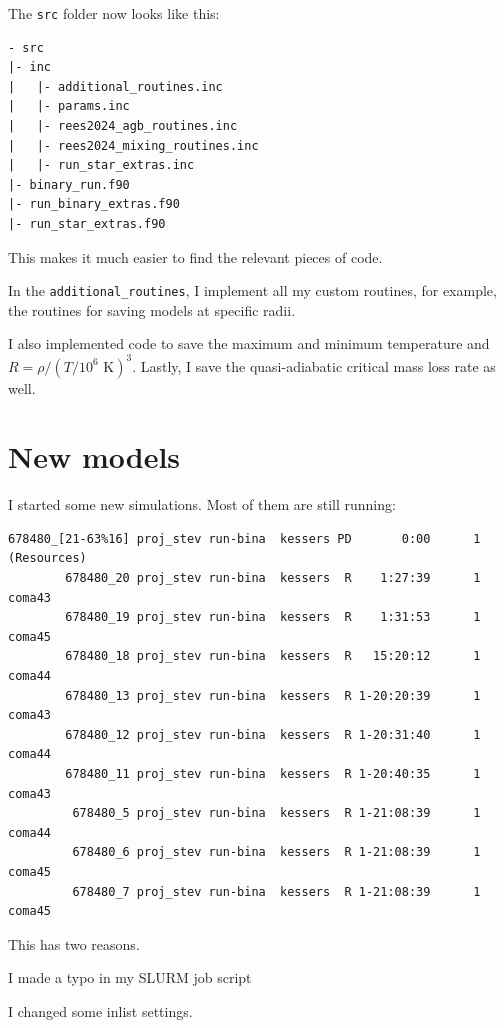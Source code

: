 \documentclass[a4paper,10pt]{article}
\begin{document}
The \lstinline[style=output, breaklines=true]|src| folder now looks like this:
\begin{verbatim}
- src
|- inc
|   |- additional_routines.inc
|   |- params.inc
|   |- rees2024_agb_routines.inc
|   |- rees2024_mixing_routines.inc
|   |- run_star_extras.inc
|- binary_run.f90
|- run_binary_extras.f90
|- run_star_extras.f90
\end{verbatim}

This makes it much easier to find the relevant pieces of code.

In the \lstinline[style=output, breaklines=true]|additional_routines|, I implement all my custom routines, for example, the routines for saving models at specific radii.


I also implemented code to save the maximum and minimum temperature and \(R = \rho / (T / 10^6 \text{ K})^3\). Lastly, I save the quasi-adiabatic critical mass loss rate as well.

\section{New models}

I started some new simulations. Most of them are still running:

\begin{verbatim}
678480_[21-63%16] proj_stev run-bina  kessers PD       0:00      1 (Resources)
        678480_20 proj_stev run-bina  kessers  R    1:27:39      1 coma43
        678480_19 proj_stev run-bina  kessers  R    1:31:53      1 coma45
        678480_18 proj_stev run-bina  kessers  R   15:20:12      1 coma44
        678480_13 proj_stev run-bina  kessers  R 1-20:20:39      1 coma43
        678480_12 proj_stev run-bina  kessers  R 1-20:31:40      1 coma44
        678480_11 proj_stev run-bina  kessers  R 1-20:40:35      1 coma43
         678480_5 proj_stev run-bina  kessers  R 1-21:08:39      1 coma44
         678480_6 proj_stev run-bina  kessers  R 1-21:08:39      1 coma45
         678480_7 proj_stev run-bina  kessers  R 1-21:08:39      1 coma45
\end{verbatim}

This has two reasons.
\begin{enumd}
    \item I made a typo in my SLURM job script
    \item I changed some inlist settings.
\end{enumd}
\end{document}
